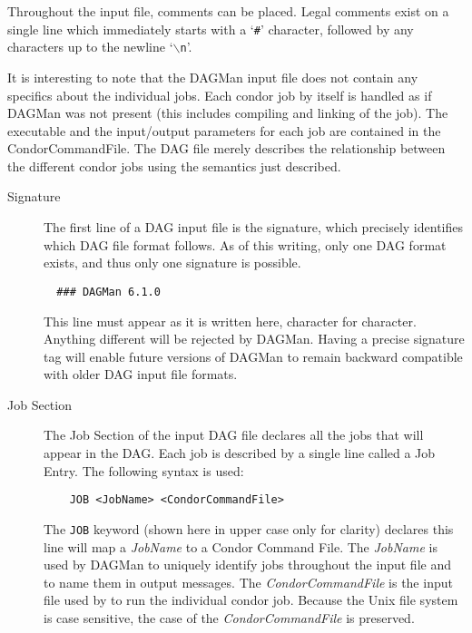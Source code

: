 Throughout the input file, comments can be placed.  Legal comments exist on a
single line which immediately starts with a `\texttt{\#}' character, followed
by any characters up to the newline `\texttt{$\backslash$n}'.

It is interesting to note that the DAGMan input file does not contain any
specifics about the individual jobs. Each condor job by itself is handled as
if DAGMan was not present (this includes compiling and linking of the
job). The executable and the input/output parameters for each job are
contained in the CondorCommandFile.  The DAG file merely describes the
relationship between the different condor jobs using the semantics just
described.

\begin{description}

\item[Signature]

The first line of a DAG input file is the signature, which precisely
identifies which DAG file format follows.  As of this writing, only one DAG
format exists, and thus only one signature is possible.

\begin{verbatim}
  ### DAGMan 6.1.0
\end{verbatim}

This line must appear as it is written here, character for character.
Anything different will be rejected by DAGMan.  Having a precise signature tag
will enable future versions of DAGMan to remain backward compatible with older
DAG input file formats.

\item[Job Section]

The Job Section of the input DAG file declares all the jobs that will appear
in the DAG.  Each job is described by a single line called a Job Entry.  The
following syntax is used:

\begin{verbatim}
	JOB <JobName> <CondorCommandFile>
\end{verbatim}

The \texttt{JOB} keyword (shown here in upper case only for clarity) declares
this line will map a \textit{JobName} to a Condor Command File.  The
\textit{JobName} is used by DAGMan to uniquely identify jobs throughout the
input file and to name them in output messages.  The
\textit{CondorCommandFile} is the input file used by  to run
the individual condor job.  Because the Unix file system is case sensitive,
the case of the \textit{CondorCommandFile} is preserved.


\end{description}
